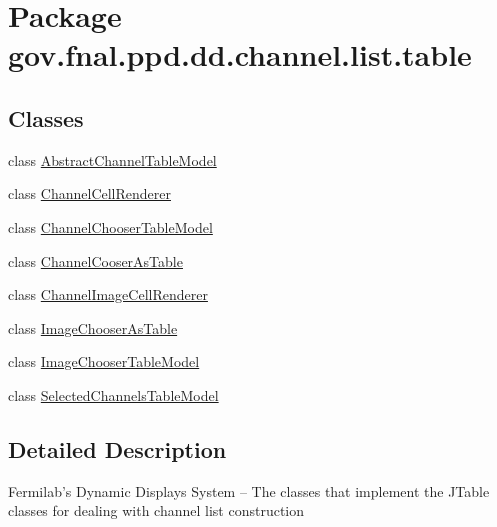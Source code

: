\hypertarget{namespacegov_1_1fnal_1_1ppd_1_1dd_1_1channel_1_1list_1_1table}{\section{Package gov.\-fnal.\-ppd.\-dd.\-channel.\-list.\-table}
\label{namespacegov_1_1fnal_1_1ppd_1_1dd_1_1channel_1_1list_1_1table}
}
\subsection*{Classes}
\begin{DoxyCompactItemize}
\item 
class \hyperlink{classgov_1_1fnal_1_1ppd_1_1dd_1_1channel_1_1list_1_1table_1_1AbstractChannelTableModel}{Abstract\-Channel\-Table\-Model}
\item 
class \hyperlink{classgov_1_1fnal_1_1ppd_1_1dd_1_1channel_1_1list_1_1table_1_1ChannelCellRenderer}{Channel\-Cell\-Renderer}
\item 
class \hyperlink{classgov_1_1fnal_1_1ppd_1_1dd_1_1channel_1_1list_1_1table_1_1ChannelChooserTableModel}{Channel\-Chooser\-Table\-Model}
\item 
class \hyperlink{classgov_1_1fnal_1_1ppd_1_1dd_1_1channel_1_1list_1_1table_1_1ChannelCooserAsTable}{Channel\-Cooser\-As\-Table}
\item 
class \hyperlink{classgov_1_1fnal_1_1ppd_1_1dd_1_1channel_1_1list_1_1table_1_1ChannelImageCellRenderer}{Channel\-Image\-Cell\-Renderer}
\item 
class \hyperlink{classgov_1_1fnal_1_1ppd_1_1dd_1_1channel_1_1list_1_1table_1_1ImageChooserAsTable}{Image\-Chooser\-As\-Table}
\item 
class \hyperlink{classgov_1_1fnal_1_1ppd_1_1dd_1_1channel_1_1list_1_1table_1_1ImageChooserTableModel}{Image\-Chooser\-Table\-Model}
\item 
class \hyperlink{classgov_1_1fnal_1_1ppd_1_1dd_1_1channel_1_1list_1_1table_1_1SelectedChannelsTableModel}{Selected\-Channels\-Table\-Model}
\end{DoxyCompactItemize}


\subsection{Detailed Description}
Fermilab's Dynamic Displays System -- The classes that implement the J\-Table classes for dealing with channel list construction